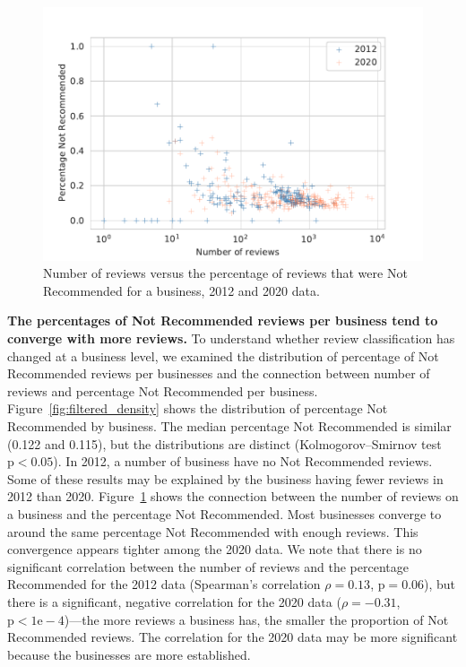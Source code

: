 \begin{figure}[t]
    \centering
    \includegraphics[width=0.9\columnwidth]{chapters/reviews/figures/filtered_vs_count.pdf}
    \caption[Number of reviews versus the percentage of reviews that were Not Recommended for a business]{Number of reviews versus the percentage of reviews that were Not Recommended for a business, 2012 and 2020 data.}
    \label{fig:count_vs_perc}
\end{figure}

\textbf{The percentages of Not Recommended reviews per business tend to converge with more reviews.} To understand whether review classification has changed at a business level, we examined the distribution of percentage of Not Recommended reviews per businesses and the connection between number of reviews and percentage Not Recommended per business. Figure~\ref{fig:filtered_density} shows the distribution of percentage Not Recommended by business. The median percentage Not Recommended is similar (0.122 and 0.115), but the distributions are distinct (Kolmogorov–Smirnov test $\text{p}<0.05$). In 2012, a number of business have no Not Recommended reviews. Some of these results may be explained by the business having fewer reviews in 2012 than 2020. Figure~\ref{fig:count_vs_perc} shows the connection between the number of reviews on a business and the percentage Not Recommended. Most businesses converge to around the same percentage Not Recommended with enough reviews. This convergence appears tighter among the 2020 data. We note that there is no significant correlation between the number of reviews and the percentage Recommended for the 2012 data (Spearman's correlation $\rho = 0.13$, $\text{p} = 0.06$), but there is a significant, negative correlation for the 2020 data ($\rho = -0.31$, $\text{p}<1\text{e}-4$)---the more reviews a business has, the smaller the proportion of Not Recommended reviews. The correlation for the 2020 data may be more significant because the businesses are more established.

